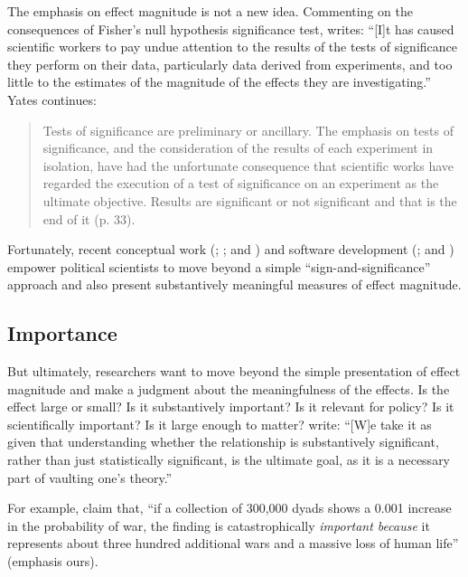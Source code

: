 \documentclass[12pt]{article}
\begin{document}
The emphasis on effect magnitude is not a new idea. Commenting on the consequences of Fisher's null hypothesis significance test, \citet[p. 32]{Yates1951} writes: ``[I]t has caused scientific workers to pay undue attention to the results of the tests of significance they perform on their data, particularly data derived from experiments, and too little to the estimates of the magnitude of the effects they are investigating.'' Yates continues: 

\begin{quote}
Tests of significance are preliminary or ancillary. The emphasis on tests of significance, and the consideration of the results of each experiment in isolation, have had the unfortunate consequence that scientific works have regarded the execution of a test of significance on an experiment as the ultimate objective. Results are significant or not significant and that is the end of it (p. 33).
\end{quote}

Fortunately, recent conceptual work (\citealt{KingTomzWittenberg2000}; \citealt{BerryDeMerittEsarey2010}; and \citealt{HanmerKalkan2013}) and software development (\citealt{TomzWittenbergKing2003}; and \citealt{ImaiKingLau2007}) empower political scientists to move beyond a simple ``sign-and-significance'' approach and also present substantively meaningful measures of effect magnitude.

\subsection*{Importance}

But ultimately, researchers want to move beyond the simple presentation of effect magnitude and make a judgment about the meaningfulness of the effects. Is the effect large or small? Is it substantively important? Is it relevant for policy? Is it scientifically important? Is it large enough to matter? \citet[p. 264]{HanmerKalkan2013} write: ``[W]e take it as given that understanding whether the relationship is substantively significant, rather than just statistically significant, is the ultimate goal, as it is a necessary part of vaulting one's theory.''

For example, \citet[p. 711]{KingZeng2001} claim that, ``if a collection of 300,000 dyads shows a 0.001 increase in the probability of war, the finding is catastrophically \emph{important because} it represents about three hundred additional wars and a massive loss of human life'' (emphasis ours).
\end{document}
